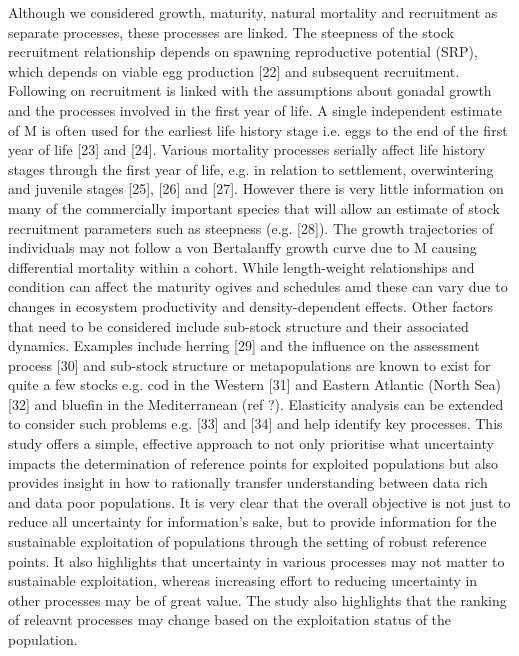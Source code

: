 \documentclass{pnastwo}
\begin{document}
\begin{article}
Although we considered growth, maturity, natural mortality and recruitment as separate processes, these processes are linked. The steepness of the stock recruitment relationship depends on spawning reproductive potential (SRP), which depends on viable egg production [22] and subsequent recruitment. Following on recruitment is linked with the assumptions about gonadal growth and the processes involved in the ﬁrst year of life. A single independent estimate of M is often used for the earliest life history stage i.e. eggs to the end of the ﬁrst year of life [23] and [24]. Various mortality processes serially aﬀect life history stages through the ﬁrst year of life, e.g. in relation to settlement, overwintering and juvenile stages [25], [26] and [27]. However there is very little information on many of the commercially important species that will allow an estimate of stock recruitment parameters such as steepness (e.g. [28]). The growth trajectories of individuals may not follow a von Bertalanﬀy growth curve due to M causing diﬀerential mortality within a cohort. While length-weight relationships and condition can aﬀect the maturity ogives and schedules amd these can vary due to changes in ecosystem productivity and density-dependent eﬀects. Other factors that need to be considered include sub-stock structure and their associated dynamics. Examples include herring [29] and the inﬂuence on the assessment process [30] and sub-stock structure or metapopulations are known to exist for quite a few stocks e.g. cod in the Western [31] and Eastern Atlantic (North Sea) [32] and blueﬁn in the Mediterranean (ref ?). 
Elasticity analysis can be extended to consider such problems e.g. [33] and [34] and help identify key processes. 
This study offers a simple, effective approach to not only prioritise what uncertainty impacts the determination of reference points for exploited populations but also provides insight in how to rationally transfer understanding between data rich and data poor populations. It is very clear that the overall objective is not just to reduce all uncertainty for information’s sake, but to provide information for the sustainable exploitation of populations through the setting of robust reference points. It also highlights that uncertainty in various processes may not matter to sustainable exploitation, whereas increasing effort to reducing uncertainty in other processes may be of great value. The study also highlights that the ranking of releavnt processes may change based on the exploitation status of the population.




\end{article}
\end{document}
